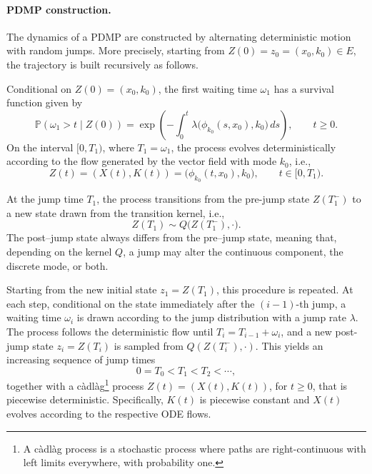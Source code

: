 \documentclass[11pt]{article}
\theoremstyle{plain}
\theoremstyle{definition}
\newcommand{\1}{\mathbf{1}}
\begin{document}
\paragraph{PDMP construction.}

The dynamics of a PDMP are constructed by alternating deterministic motion with random jumps. More precisely, starting from $Z(0)=z_0=(x_0, k_0) \in E$, the trajectory is built recursively as follows.

Conditional on $Z(0)=(x_0,k_0)$, the first waiting time $\omega_1$ has a survival function given by
\begin{equation*}
 \mathbb{P}(\omega_1 > t \mid Z(0)) 
= \exp\!\left(-\int_0^t \lambda\big(\phi_{k_0}(s, x_0), k_0\big)\,ds\right), 
\qquad t \ge 0.   
\end{equation*}
On the interval $[0, T_1)$, where $T_1 = \omega_1$, the process evolves deterministically according to the flow generated by the vector field with mode $k_0$, i.e.,
\begin{equation*}
  Z(t) = (X(t),K(t)) = \big( \phi_{k_0}(t, x_0), k_0\big), \qquad t \in [0, T_1).
\end{equation*}

\noindent At the jump time $T_1$, the process transitions from the pre-jump state $Z({T_1^-})$ to a new state drawn from the transition kernel, i.e.,
\begin{equation*}
  Z({T_1}) \sim Q\big(Z({T_1^-}), \cdot\big).
\end{equation*}
The post–jump state always differs from the pre–jump state, meaning that, depending on the kernel $Q$, a jump may alter the continuous component, the discrete mode, or both.

Starting from the new initial state $z_1=Z({T_1})$, this procedure is repeated. At each step, conditional on the state immediately after the $(i-1)$-th jump, a waiting time $\omega_i$ is drawn according to the jump distribution with a jump rate $\lambda$. The process follows the deterministic flow until $T_i = T_{i-1} + \omega_i$, and a new post-jump state $z_i=Z({T_i})$ is sampled from $Q(Z({T_i^-}), \cdot)$. This yields an increasing sequence of jump times
\begin{equation*}
  0 = T_0 < T_1 < T_2 < \cdots,
\end{equation*}
together with a c\`adl\`ag\footnote{A c\`adl\`ag process is a stochastic process where paths are right-continuous with left limits everywhere, with probability one.} process $Z(t)=(X(t),K(t))$, for ${t \geq 0}$, that is piecewise deterministic. Specifically, $K(t)$ is piecewise constant and $X(t)$ evolves according to the respective ODE flows. 
\end{document}
